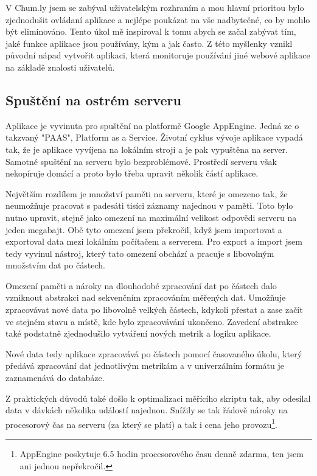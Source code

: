 \documentclass[bc,male,java,dept456]{diploma}						%
\begin{document}
V Chum.ly jsem se zabýval uživatelským rozhraním a mou hlavní prioritou bylo zjednodušit ovládaní aplikace a nejlépe poukázat na vše nadbytečné, co by mohlo být eliminováno. Tento úkol mě inspiroval k tomu abych se začal zabývat tím, jaké funkce aplikace jsou používány, kým a jak často. Z této myšlenky vznikl původní nápad vytvořit aplikaci, která monitoruje používání jiné webové aplikace na základě znalosti uživatelů.


\subsection{Spuštění na ostrém serveru}

Aplikace je vyvinuta pro spuštění na platformě Google AppEngine. Jedná ze o takzvaný "PAAS", Platform as a Service. Životní cyklus vývoje aplikace vypadá tak, že je aplikace vyvíjena na lokálním stroji a je pak vypuštěna na server. Samotné spuštění na serveru bylo bezproblémové. Prostředí serveru však nekopíruje domácí a proto bylo třeba upravit několik částí aplikace.

Největším rozdílem je množství paměti na serveru, které je omezeno tak, že ne\-u\-mo\-žňu\-je pracovat s padesáti tisíci záznamy najednou v paměti. Toto bylo nutno upravit, stejně jako omezení na maximální velikost odpovědi serveru na jeden megabajt. Obě tyto omezení jsem překročil, když jsem importovat a exportoval data mezi lokálním počítačem a serverem. Pro export a import jsem tedy vyvinul nástroj, který tato omezení obchází a pracuje s libovolným množstvím dat po částech.

Omezení paměti a nároky na dlouhodobé zpracování dat po částech dalo vzniknout abstrakci nad sekvenčním zpracováním měřených dat. Umožňuje zpracovávat nové data po libovolně velkých částech, kdykoli přestat a zase začít ve stejném stavu a místě, kde bylo zpracovávání ukončeno. Zavedení abstrakce také podstatně zjednodušilo vytváření nových metrik a logiku aplikace.

Nové data tedy aplikace zpracovává po částech pomocí časovaného úkolu, který předává zpracování dat jednotlivým metrikám a v univerzálním formátu je zaznamenává do databáze.

Z praktických důvodů také došlo k optimalizaci měřícího skriptu tak, aby odesílal data v dávkách několika událostí najednou. Snížily se tak řádově nároky na procesorový čas na serveru (za který se platí) a tak i cena jeho provozu\footnote{AppEngine poskytuje 6.5 hodin procesorového času denně zdarma, ten jsem ani jednou nepřekročil.}.
\end{document}
